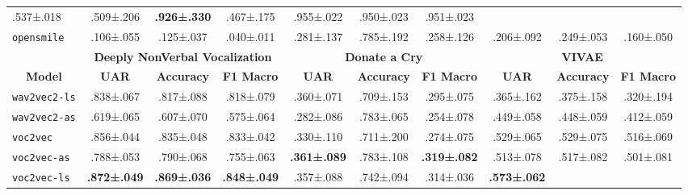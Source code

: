 \begin{table*}[]
\begin{tabular}{l|ccc|ccc|ccc}
  .537\scriptsize±.018 &
  .509\scriptsize±.206 &
  \cellcolor[HTML]{D9EAD3}\textbf{.926\scriptsize±.330} &
  .467\scriptsize±.175 &
  .955\scriptsize±.022 &
  .950\scriptsize±.023 &
  .951\scriptsize±.023 \\
\texttt{opensmile} &
  .106\scriptsize±.055 &
  .125\scriptsize±.037 &
  .040\scriptsize±.011 &
  .281\scriptsize±.137 &
  .785\scriptsize±.192 &
  .258\scriptsize±.126 &
  .206\scriptsize±.092 &
  .249\scriptsize±.053 &
  .160\scriptsize±.050 \\
\midrule \midrule
\multicolumn{1}{c}{} &
  \multicolumn{3}{c}{\textbf{Deeply NonVerbal Vocalization}} &
  \multicolumn{3}{c}{\textbf{Donate a Cry}} &
  \multicolumn{3}{c}{\textbf{VIVAE}} \\
\multicolumn{1}{c}{\multirow{-2}{*}{\textbf{Model}}} &
  \textbf{UAR} &
  \textbf{Accuracy} &
  \textbf{F1 Macro} &
  \textbf{UAR} &
  \textbf{Accuracy} &
  \textbf{F1 Macro} &
  \textbf{UAR} &
  \textbf{Accuracy} &
  \textbf{F1 Macro} \\
\midrule
\texttt{wav2vec2-ls} &
  .838\scriptsize±.067 &
  .817\scriptsize±.088 &
  .818\scriptsize±.079 &
  .360\scriptsize±.071 &
  .709\scriptsize±.153 &
  .295\scriptsize±.075 &
  .365\scriptsize±.162 &
  .375\scriptsize±.158 &
  .320\scriptsize±.194 \\
\texttt{wav2vec2-as} &
  .619\scriptsize±.065 &
  .607\scriptsize±.070 &
  .575\scriptsize±.064 &
  .282\scriptsize±.086 &
  .783\scriptsize±.065 &
  .254\scriptsize±.078 &
  .449\scriptsize±.058 &
  .448\scriptsize±.059 &
  .412\scriptsize±.059 \\
\texttt{voc2vec} &
  .856\scriptsize±.044 &
  .835\scriptsize±.048 &
  .833\scriptsize±.042 &
  .330\scriptsize±.110 &
  .711\scriptsize±.200 &
  .274\scriptsize±.075 &
  .529\scriptsize±.065 &
  .529\scriptsize±.075 &
  .516\scriptsize±.069 \\
\texttt{voc2vec-as} &
  .788\scriptsize±.053 &
  .790\scriptsize±.068 &
  .755\scriptsize±.063 &
  \cellcolor[HTML]{D9EAD3}\textbf{.361\scriptsize±.089} &
  .783\scriptsize±.108 &
  \cellcolor[HTML]{D9EAD3}\textbf{.319\scriptsize±.082} &
  .513\scriptsize±.078 &
  .517\scriptsize±.082 &
  .501\scriptsize±.081 \\
\texttt{voc2vec-ls} &
  \cellcolor[HTML]{D9EAD3}\textbf{.872\scriptsize±.049} &
  \cellcolor[HTML]{D9EAD3}\textbf{.869\scriptsize±.036} &
  \cellcolor[HTML]{D9EAD3}\textbf{.848\scriptsize±.049} &
  .357\scriptsize±.088 &
  .742\scriptsize±.094 &
  .314\scriptsize±.036 &
  \cellcolor[HTML]{D9EAD3}\textbf{.573\scriptsize±.062} &

\end{tabular}
\end{table*}
